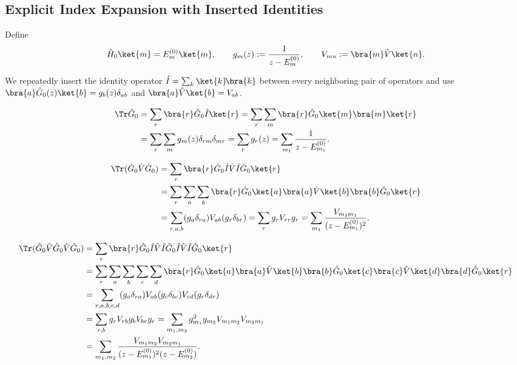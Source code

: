 \subsection{Explicit Index Expansion with Inserted Identities}
Define
\[
  \hat H_0\ket{m}=E_m^{(0)}\ket{m},\qquad
  g_m(z):=\frac{1}{z-E_m^{(0)}},\qquad
  V_{mn}:=\bra{m}\hat V\ket{n}.
\]

We repeatedly insert the identity operator $\hat
I=\sum_k\ket{k}\!\bra{k}$ between every neighboring pair of operators and use
$\bra{a}\hat G_0(z)\ket{b}=g_b(z)\delta_{ab}$ and $\bra{a}\hat
V\ket{b}=V_{ab}$.

\begin{align}
  \Tr\hat G_0
  &=\sum_{r}\bra{r}\hat G_0\hat I\ket{r}
  =\sum_{r}\sum_{m}\bra{r}\hat G_0\ket{m}\bra{m}\ket{r} \notag\\
  &=\sum_{r}\sum_{m} g_m(z)\delta_{rm}\delta_{mr}
  =\sum_{r} g_r(z)
  =\sum_{m_1}\frac{1}{z-E_{m_1}^{(0)}}. \label{eq:F0_explicit}
\end{align}

\begin{align}
  \Tr(\hat G_0\hat V\hat G_0)
  &=\sum_{r}\bra{r}\hat G_0\hat I\hat V\hat I\hat
  G_0\ket{r} \notag\\
  &=\sum_{r}\sum_{a}\sum_{b}\bra{r}\hat G_0\ket{a}\bra{a}\hat
  V\ket{b}\bra{b}\hat G_0\ket{r} \notag\\
  &=\sum_{r,a,b} (g_a\delta_{ra})V_{ab}(g_r\delta_{br})
  =\sum_{r} g_r V_{rr} g_r
  =\sum_{m_1}\frac{V_{m_1m_1}}{(z-E_{m_1}^{(0)})^2}. \label{eq:F1_explicit}
\end{align}

\begin{align}
  \Tr(\hat G_0\hat V\hat G_0\hat V\hat G_0)
  &=\sum_{r}\bra{r}\hat G_0\hat I\hat V\hat I\hat G_0\hat
  I\hat V\hat I\hat G_0\ket{r} \notag\\
  &=\sum_{r}\sum_{a}\sum_{b}\sum_{c}\sum_{d}
  \bra{r}\hat G_0\ket{a}\bra{a}\hat V\ket{b}\bra{b}\hat G_0\ket{c}
  \bra{c}\hat V\ket{d}\bra{d}\hat G_0\ket{r} \notag\\
  &=\sum_{r,a,b,c,d}
  (g_a\delta_{ra})V_{ab}(g_c\delta_{bc})V_{cd}(g_r\delta_{dr})
  \notag\\
  &=\sum_{r,b} g_rV_{rb}g_bV_{br}g_r
  =\sum_{m_1,m_2} g_{m_1}^2g_{m_2}V_{m_1 m_2}V_{m_2 m_1} \notag\\
  &=\sum_{m_1,m_2}
  \frac{V_{m_1 m_2}V_{m_2 m_1}}
  {(z-E_{m_1}^{(0)})^2(z-E_{m_2}^{(0)})}. \label{eq:F2_explicit}
\end{align}

